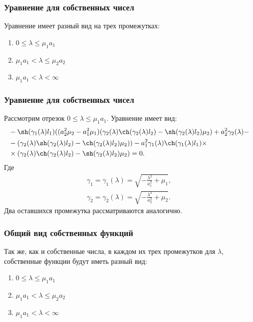 \documentclass[10pt,pdf,hyperref={unicode}]{beamer}
\begin{document}
\begin{frame}
  \frametitle{Уравнение для собственных чисел}

  Уравнение имеет разный вид на трех промежутках:
  \begin{enumerate}
    \item $ 0 \le \lambda \le \mu_1a_1$
    \item $ \mu_1a_1 < \lambda \le \mu_2a_2 $
    \item $\mu_1a_1 < \lambda < \infty$
  \end{enumerate}
\end{frame}
\begin{frame}
  \frametitle{Уравнение для собственных чисел}
  Рассмотрим отрезок $ 0 \le \lambda \le \mu_1a_1$. Уравнение имеет вид: 
  \begin{equation*}
    \begin{aligned}
    & -\sh(\gamma_1(\lambda) l_1) ((a_2^2 \mu_2-a_1^2 \mu_1) (\gamma_2(\lambda) \ch(\gamma_2(\lambda) l_2)-\sh(\gamma_2(\lambda) l_2) \mu_2)+a_2^2 \gamma_2(\lambda)- \\
    & -(\gamma_2(\lambda) \sh(\gamma_2(\lambda) l_2)-\ch(\gamma_2(\lambda) l_2) \mu_2))-a_1^2 \gamma_1(\lambda) \ch(\gamma_1(\lambda) l_1) \times \\
    & \times (\gamma_2(\lambda) \ch(\gamma_2(\lambda) l_2)-\sh(\gamma_2(\lambda) l_2) \mu_2) = 0.
    \end{aligned}
  \end{equation*}
  Где
  \begin{equation*}
    \begin{aligned}
      \gamma_1 = \gamma_1(\lambda) = \sqrt{- \frac{\lambda^2}{a_1^2} + \mu_1}, \\
      \gamma_2 = \gamma_2(\lambda) = \sqrt{- \frac{\lambda^2}{a_2^2} + \mu_2}.
    \end{aligned}
  \end{equation*}
  Два оставшихся промежутка рассматриваются аналогично.
\end{frame}

\begin{frame}
  \frametitle{Общий вид собственных функций}
  Так же, как и собственные числа, в каждом их трех промежутков для $\lambda$, собственные функции будут иметь разный вид:
  \begin{enumerate}
    \item $ 0 \le \lambda \le \mu_1a_1$
    \item $ \mu_1a_1 < \lambda \le \mu_2a_2 $
    \item $\mu_1a_1 < \lambda < \infty$
  \end{enumerate}
\end{frame}
\end{document}
